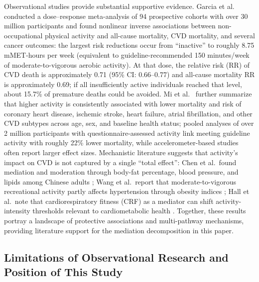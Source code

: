 \documentclass[12pt,a4paper]{article}
\begin{document}
Observational studies provide substantial supportive evidence. Garcia et al.\ \cite{garcia2023meta} conducted a dose--response meta-analysis of 94 prospective cohorts with over 30 million participants and found nonlinear inverse associations between non-occupational physical activity and all-cause mortality, CVD mortality, and several cancer outcomes: the largest risk reductions occur from ``inactive'' to roughly 8.75 mMET-hours per week (equivalent to guideline-recommended 150 minutes/week of moderate-to-vigorous aerobic activity). At that dose, the relative risk (RR) of CVD death is approximately 0.71 (95\% CI: 0.66--0.77) and all-cause mortality RR is approximately 0.69; if all insufficiently active individuals reached that level, about 15.7\% of premature deaths could be avoided. Mi et al.\ \cite{mi2025creview} further summarize that higher activity is consistently associated with lower mortality and risk of coronary heart disease, ischemic stroke, heart failure, atrial fibrillation, and other CVD subtypes across age, sex, and baseline health status; pooled analyses of over 2 million participants with questionnaire-assessed activity link meeting guideline activity with roughly 22\% lower mortality, while accelerometer-based studies often report larger effect sizes. Mechanistic literature suggests that activity's impact on CVD is not captured by a single ``total effect'': Chen et al.\ found mediation and moderation through body-fat percentage, blood pressure, and lipids among Chinese adults \cite{chen2023pa}; Wang et al.\ report that moderate-to-vigorous recreational activity partly affects hypertension through obesity indices \cite{wang2023obesity}; Hall et al.\ note that cardiorespiratory fitness (CRF) as a mediator can shift activity-intensity thresholds relevant to cardiometabolic health \cite{bjsports2023crf}. Together, these results portray a landscape of protective associations and multi-pathway mechanisms, providing literature support for the mediation decomposition in this paper.

\subsection{Limitations of Observational Research and Position of This Study}
\end{document}
